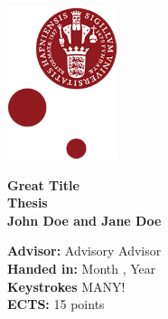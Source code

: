 
\begin{titlepage}
\begin{flushleft}
\end{flushleft}

\setlength{\columnsep}{0.5in}
\setcolumnwidth{4in, 1.07in}

\begin{paracol}{2}
    \begin{tcolorbox}[blanker, breakable, width=\linewidth]
    \vspace*{0.25in}
    \onehalfspacing
    \end{tcolorbox}
    \switchcolumn
    \begin{tcolorbox}[blanker, breakable, width=\linewidth]
        \hfill\includegraphics[width=1.27in]{99 graphics/KU-logo.png}
    \end{tcolorbox}
\end{paracol}

\vspace*{-1.05cm}
\noindent\textcolor{KUrod}{\makebox[\linewidth]{\rule{\paperwidth}{0.4pt}}} 

\begin{flushleft}
    \vspace{5cm}
    \Large \textbf{Great Title}\\

    \vspace{3cm}
    \Large \textbf{Thesis}\\
    \large \textbf{John Doe and Jane Doe}

\vfill
\normalsize
    \textbf{Advisor:} Advisory Advisor\\
    \textbf{Handed in:} Month , Year\\
    \textbf{Keystrokes} MANY! \\
    \textbf{ECTS:} 15 points
\end{flushleft}
\end{titlepage}
